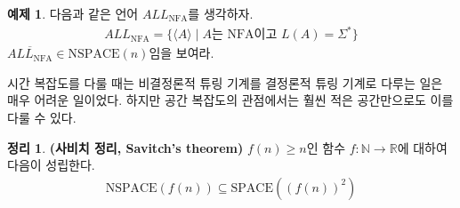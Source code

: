 \documentclass[b5paper, 11pt]{book}
\theoremstyle{definition}
\newtheorem{thm}[defn]{정리}
\newtheorem{ex}[defn]{예제}
\begin{document}
\begin{ex}
    다음과 같은 언어 $ALL_\text{NFA}$를 생각하자.
    \begin{align*}
        ALL_{\text{NFA}} = \{ \langle A \rangle \;\vert\; A \text{는 NFA이고 } L(A) = \Sigma^*\}
    \end{align*}
    $\overline{ALL_{\text{NFA}}} \in \text{NSPACE}(n)$임을 보여라.
\end{ex}
시간 복잡도를 다룰 때는 비결정론적 튜링 기계를 결정론적 튜링 기계로 다루는 일은 매우 어려운 일이었다. 하지만 공간 복잡도의 관점에서는 훨씬 적은 공간만으로도 이를 다룰 수 있다.
\begin{thm}\label{savitch thm}
    \textbf{(사비치 정리, Savitch's theorem)}
    $f(n) \ge n$인 함수 $f: \mathbb{N} \rightarrow \mathbb{R}$에 대하여 다음이 성립한다.
    \begin{align*}
        \text{NSPACE}(f(n)) \subseteq \text{SPACE}((f(n))^2)
    \end{align*}
\end{thm}
\end{document}
